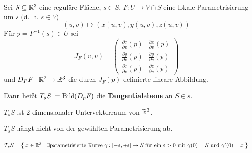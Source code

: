 \begin{definition}%
    Sei $S \subseteq \mathbb{R}^3$ eine reguläre Fläche, $s \in S$,
    $F: U \rightarrow V \cap S$ eine lokale Parametrisierung um $s$
    (d.~h. $s \in V$)
    \[(u,v) \mapsto (x(u,v), y(u,v), z(u,v))\]
    Für $p=F^{-1}(s) \in U$ sei
    \[        J_F(u,v) = \begin{pmatrix}
            \frac{\partial x}{\partial u} (p) & \frac{\partial x}{\partial v} (p)\\
            \frac{\partial y}{\partial u} (p) & \frac{\partial y}{\partial v} (p)\\
            \frac{\partial z}{\partial u} (p) & \frac{\partial z}{\partial v} (p)
        \end{pmatrix}\]
    und $D_P F: \mathbb{R}^2 \rightarrow \mathbb{R}^3$ die durch $J_F (p)$
    definierte lineare Abbildung.

    Dann heißt $T_s S := \operatorname{Bild}(D_p F)$ die \textbf{Tangentialebene}
    an $S \in s$.
\end{definition}

\begin{bemerkung}%
    $T_s S$ ist $2$-dimensionaler Untervektorraum von $\mathbb{R}^3$.
\end{bemerkung}

\begin{bemerkung}%
    $T_s S$ hängt nicht von der gewählten Parametrisierung ab.
\end{bemerkung}

\begin{beweis}\leavevmode
    \begin{behauptung}
        $T_s S = \Set{x \in \ensuremath{\mathbb{R}}^3 | \exists \text{parametrisierte Kurve } \gamma:[- \varepsilon, + \varepsilon] \rightarrow S \text{ für ein } \varepsilon > 0 \text{ mit } \gamma(0) = S \text{ und } \gamma'(0) = x}$
    \end{behauptung}
\end{beweis}

